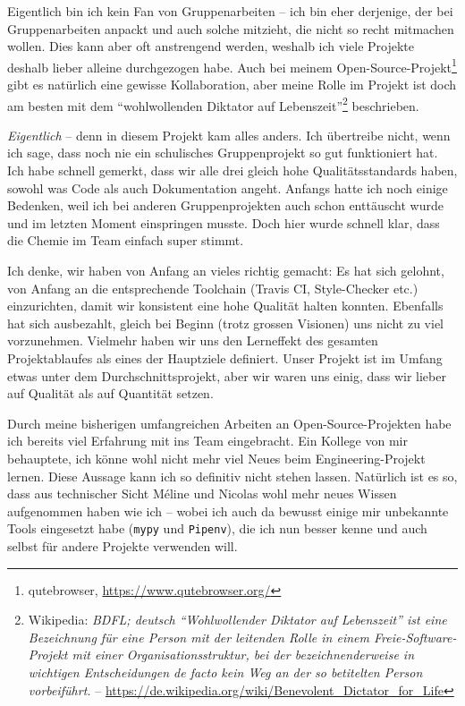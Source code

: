 \documentclass[a4paper]{article}
\begin{document}
Eigentlich bin ich kein Fan von Gruppenarbeiten -- ich bin eher derjenige, der bei Gruppenarbeiten anpackt und auch solche mitzieht, die nicht so recht
mitmachen wollen. Dies kann aber oft anstrengend werden, weshalb ich viele Projekte deshalb lieber alleine durchgezogen habe. Auch bei meinem
Open-Source-Projekt\footnote{qutebrowser, \url{https://www.qutebrowser.org/}}
gibt es natürlich eine gewisse Kollaboration, aber meine Rolle im Projekt ist
doch am besten mit dem ``wohlwollenden Diktator auf
Lebenszeit''\footnote{Wikipedia: \emph{BDFL; deutsch ``Wohlwollender Diktator auf Lebenszeit'' ist eine Bezeichnung für eine Person mit der leitenden Rolle in einem Freie-Software-Projekt mit einer Organisationsstruktur, bei der bezeichnenderweise in wichtigen Entscheidungen de facto kein Weg an der so betitelten Person vorbeiführt.} -- \url{https://de.wikipedia.org/wiki/Benevolent_Dictator_for_Life}} beschrieben.

\emph{Eigentlich} -- denn in diesem Projekt kam alles anders. Ich übertreibe
nicht, wenn ich sage, dass noch nie ein schulisches Gruppenprojekt so gut
funktioniert hat. Ich habe schnell gemerkt, dass wir alle drei gleich hohe
Qualitätsstandards haben, sowohl was Code als auch Dokumentation angeht. Anfangs hatte ich noch einige Bedenken, weil ich bei anderen Gruppenprojekten
auch schon enttäuscht wurde und im letzten Moment einspringen musste. Doch hier wurde schnell klar, dass die Chemie im Team einfach super stimmt.

Ich denke, wir haben von Anfang an vieles richtig gemacht: Es hat sich
gelohnt, von Anfang an die entsprechende Toolchain (Travis CI, Style-Checker
etc.) einzurichten, damit wir konsistent eine hohe Qualität halten konnten.
Ebenfalls hat sich ausbezahlt, gleich bei Beginn (trotz grossen Visionen) uns
nicht zu viel vorzunehmen. Vielmehr haben wir uns den Lerneffekt des gesamten
Projektablaufes als eines der Hauptziele definiert. Unser Projekt ist im Umfang etwas unter dem Durchschnittsprojekt, aber wir waren uns einig, dass wir lieber auf Qualität als auf Quantität setzen.

Durch meine bisherigen umfangreichen Arbeiten an Open-Source-Projekten habe ich bereits viel Erfahrung mit ins Team eingebracht. Ein Kollege von mir behauptete, ich könne wohl nicht mehr viel Neues beim Engineering-Projekt lernen. Diese Aussage kann ich so definitiv nicht stehen lassen. Natürlich ist es so, dass aus technischer Sicht Méline und Nicolas wohl mehr neues Wissen aufgenommen
haben wie ich -- wobei ich auch da bewusst einige mir unbekannte Tools
eingesetzt habe (\verb|mypy| und \verb|Pipenv|), die ich nun besser kenne und auch selbst für
andere Projekte verwenden will.
\end{document}
